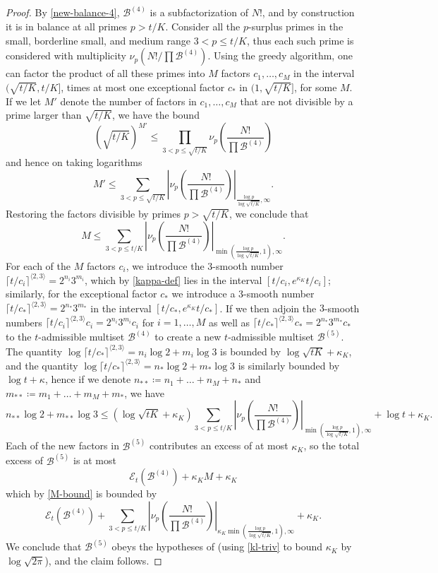 \documentclass[12pt,a4paper,reqno]{amsart}
\numberwithin{equation}{section}
\theoremstyle{plain}
\theoremstyle{definition}
\newcommand\tuple{{\mathcal B}}
\newcommand\excess{{\mathcal{E}}}
\begin{document}
\begin{proof} By \eqref{new-balance-4}, $\tuple^{(4)}$ is a subfactorization of $N!$, and by construction it is in balance at all primes $p>t/K$. Consider all the $p$-surplus primes in the small, borderline small, and medium range $3 < p \leq t/K$, thus each such prime is considered with multiplicity $\nu_p(N!/\prod \tuple^{(4)})$.  
Using the greedy algorithm, one can factor the product of all these primes into $M$ factors $c_1,\dots,c_M$ in the interval $(\sqrt{t/K}, t/K]$, times at most one exceptional factor $c_*$ in $(1,\sqrt{t/K}]$, for some $M$.  If we let $M'$ denote the number of factors in $c_1,\dots,c_M$ that are not divisible by a prime larger than $\sqrt{t/K}$, we have the bound
$$ \left(\sqrt{t/K}\right)^{M'} \leq
\prod_{3 < p \leq \sqrt{t/K}} \nu_p\left(\frac{N!}{\prod \tuple^{(4)}}\right)$$
and hence on taking logarithms
$$
M' \leq \sum_{3 < p \leq \sqrt{t/K}}
\left|\nu_p\left(\frac{N!}{\prod \tuple^{(4)}}\right)\right|_{\frac{\log p}{\log\sqrt{t/K}},\infty}. 
$$
Restoring the factors divisible by primes $p > \sqrt{t/K}$, we conclude that 
\begin{equation}\label{M-bound}  M \leq \sum_{3 < p \leq t/K}
\left|\nu_p\left(\frac{N!}{\prod \tuple^{(4)}}\right)\right|_{\min(\frac{\log p}{\log\sqrt{t/K}},1),\infty}. \end{equation}
For each of the $M$ factors $c_i$, we introduce the $3$-smooth number $\lceil t/c_i\rceil^{\langle 2,3\rangle} = 2^{n_i} 3^{m_i}$, which by \eqref{kappa-def} lies in the interval $[t/c_i,e^{\kappa_K} t/c_i]$; similarly, for the exceptional factor $c_*$ we introduce a $3$-smooth number $\lceil t/c_* \rceil^{\langle 2,3 \rangle} = 2^{n_*} 3^{m_*}$ in the interval $[t/c_*,e^{\kappa_K} t/c_*]$.  If we then adjoin the $3$-smooth numbers $\lceil t/c_i\rceil^{\langle 2,3\rangle} c_i = 2^{n_i} 3^{m_i} c_i$ for $i=1,\dots,M$ as well as $\lceil t/c_*\rceil^{\langle 2,3\rangle} c_* = 2^{n_*} 3^{m_*} c_*$ to the $t$-admissible multiset $\tuple^{(4)}$ to create a new $t$-admissible multiset $\tuple^{(5)}$.  The quantity $\log \lceil t/c_*\rceil^{\langle 2,3\rangle} = n_i \log 2 + m_i \log 3$ is bounded by $\log \sqrt{tK} + \kappa_K$, and the quantity $\log \lceil t/c_*\rceil^{\langle 2,3\rangle}  = n_* \log 2 + m_* \log 3$ is similarly bounded by $\log t + \kappa$, hence if we denote $n_{**} \coloneqq n_1 + \dots + n_M + n_*$ and $m_{**} \coloneqq m_1 + \dots + m_M + m_*$, we have
$$ n_{**} \log 2 + m_{**} \log 3 \leq 
(\log \sqrt{tK} + \kappa_K)
\sum_{3 < p \leq t/K}
\left|\nu_p\left(\frac{N!}{\prod \tuple^{(4)}}\right)\right|_{\min(\frac{\log p}{\log\sqrt{t/K}},1),\infty}
+ \log t + \kappa_K.$$
Each of the new factors in $\tuple^{(5)}$ contributes an excess of at most $\kappa_K$, so the total excess of $\tuple^{(5)}$ is at most
$$ \excess_t(\tuple^{(4)}) + \kappa_K M + \kappa_K$$
which by \eqref{M-bound} is bounded by
$$ \excess_t(\tuple^{(4)}) + \sum_{3 < p \leq t/K}
\left|\nu_p\left(\frac{N!}{\prod \tuple^{(4)}}\right)\right|_{\kappa_K \min(\frac{\log p}{\log\sqrt{t/K}},1),\infty} + \kappa_K.$$
We conclude that $\tuple^{(5)}$ obeys the hypotheses of  (using \eqref{kl-triv} to bound $\kappa_K$ by $\log \sqrt{2\pi}$), and the claim follows.
\end{proof}
\end{document}
